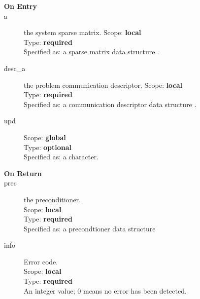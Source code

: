

\begin{description}
\item[\bf On Entry]
\item[a] the system sparse matrix.
Scope: {\bf local} \\
Type: {\bf required}\\
Specified as: a sparse matrix data structure \spdata.
\item[desc\_a] the problem communication descriptor. 
Scope: {\bf local} \\
Type: {\bf required}\\
Specified as: a communication descriptor data structure \descdata.
\item[upd] 
Scope: {\bf global} \\
Type: {\bf optional}\\
Specified as: a character.
\end{description}

\begin{description}
\item[\bf On Return]
\item[prec] the preconditioner.\\
Scope: {\bf local} \\
Type: {\bf required}\\
Specified as: a precondtioner data structure \precdata\\
\item[info] Error code.\\
Scope: {\bf local} \\
Type: {\bf required} \\
An integer value; 0 means no error has been detected. 
\end{description}





